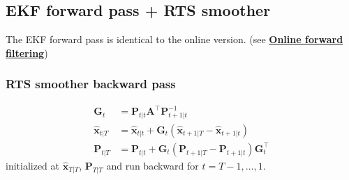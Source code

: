 \documentclass[11pt,letterpaper]{article} %
\begin{document}
\clearpage
\subsection*{EKF forward pass + RTS smoother}
The EKF forward pass is identical to the online version. 
(see \hyperref[sec:online_filtering]{\textbf{Online forward filtering}})

\subsubsection*{RTS smoother backward pass}
\begin{align*}
    \bm{G}_t             &= \bm{P}_{t|t}\bm{A}^\top \bm{P}_{t+1|t}^{-1} \\
    \hat{\bm{x}}_{t|T}   &= \hat{\bm{x}}_{t|t}
                                + \bm{G}_t\!\left(\hat{\bm{x}}_{t+1|T} - \hat{\bm{x}}_{t+1|t}\right) \\
    \bm{P}_{t|T}         &= \bm{P}_{t|t}
                                + \bm{G}_t\!\left(\bm{P}_{t+1|T} - \bm{P}_{t+1|t}\right)\bm{G}_t^\top
\end{align*}
initialized at $\hat{\bm{x}}_{T|T}$, $\bm{P}_{T|T}$ and run backward for $t = T-1, \ldots, 1$.
\end{document}
